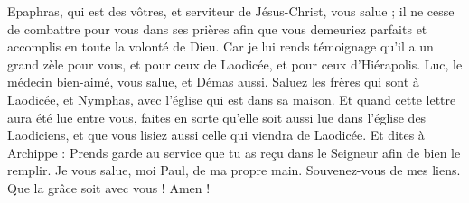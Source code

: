 \begin{multicols}{2}
Epaphras, qui est des vôtres, et serviteur de Jésus-Christ, vous salue ; il ne cesse de combattre pour vous dans ses prières afin que vous demeuriez parfaits et accomplis en toute la volonté de Dieu.
Car je lui rends témoignage qu'il a un grand zèle pour vous, et pour ceux de Laodicée, et pour ceux d'Hiérapolis.
Luc, le médecin bien-aimé, vous salue, et Démas aussi.
Saluez les frères qui sont à Laodicée, et Nymphas, avec l'église qui est dans sa maison.
Et quand cette lettre aura été lue entre vous, faites en sorte qu'elle soit aussi lue dans l'église des Laodiciens, et que vous lisiez aussi celle qui viendra de Laodicée.
Et dites à Archippe : Prends garde au service que tu as reçu dans le Seigneur afin de bien le remplir.
Je vous salue, moi Paul, de ma propre main. Souvenez-vous de mes liens. Que la grâce soit avec vous ! Amen !
\PPE{}
\end{multicols}
